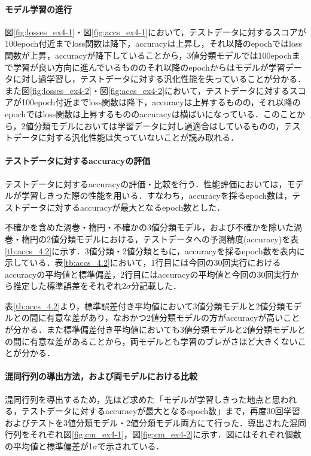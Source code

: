 \documentclass[a4j, 11pt]{jreport}
\begin{document}
\paragraph{モデル学習の進行}
図\ref{fig:losses_ex4-1}・図\ref{fig:accs_ex4-1}において，テストデータに対するスコアが100epoch付近までloss関数は降下，accuracyは上昇し，それ以降のepochではloss関数が上昇，accuracyが降下していることから，3値分類モデルでは100epochまで学習が良い方向に進んでいるもののそれ以降のepochからはモデルが学習データに対し過学習し，テストデータに対する汎化性能を失っていることが分かる．\\また図\ref{fig:losses_ex4-2}・図\ref{fig:accs_ex4-2}において，テストデータに対するスコアが100epoch付近までloss関数は降下，accuracyは上昇するものの，それ以降のepochではloss関数は上昇するもののaccuracyは横ばいになっている．このことから，2値分類モデルにおいては学習データに対し過適合はしているものの，テストデータに対する汎化性能は失っていないことが読み取れる．

\paragraph{テストデータに対するaccuracyの評価}
テストデータに対するaccuracyの評価・比較を行う．性能評価においては，モデルが学習しきった際の性能を用いる．すなわち，accuracyを採るepoch数は，テストデータに対するaccuracyが最大となるepoch数とした．


不確かを含めた渦巻・楕円・不確かの3値分類モデル，および不確かを除いた渦巻・楕円の2値分類モデルにおける，テストデータへの予測精度(accuracy)を表\ref{tb:accs_4.2}に示す．3値分類・2値分類ともに，accuracyを採るepoch数を表内に示している．表\ref{tb:accs_4.2}において，1行目には今回の30回実行におけるaccuracyの平均値と標準偏差，2行目にはaccuracyの平均値と今回の30回実行から推定した標準誤差をそれぞれ2$\sigma$分記載した．

表\ref{tb:accs_4.2}より，標準誤差付き平均値において3値分類モデルと2値分類モデルとの間に有意な差があり，なおかつ2値分類モデルの方がaccuracyが高いことが分かる．また標準偏差付き平均値においても3値分類モデルと2値分類モデルとの間に有意な差があることから，両モデルとも学習のブレがさほど大きくないことが分かる．

\paragraph{混同行列の導出方法，および両モデルにおける比較}
混同行列を導出するため，先ほど求めた「モデルが学習しきった地点と思われる，テストデータに対するaccuracyが最大となるepoch数」まで，再度30回学習およびテストを3値分類モデル・2値分類モデル両方にて行った．導出された混同行列をそれぞれ図\ref{fig:cm_ex4-1}，図\ref{fig:cm_ex4-2}に示す．図にはそれぞれ個数の平均値と標準偏差が1$\sigma$で示されている．
\end{document}
